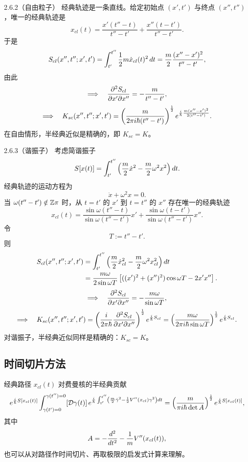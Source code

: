 \begin{example}{2.6.2（自由粒子）}
  经典轨迹是一条直线。给定初始点 $(x',t')$ 与终点 $(x'',t'')$，唯一的经典轨迹是
  \[
  x_{cl}(t)=\frac{x'(t''-t)}{t''-t'}+\frac{x''(t-t')}{t''-t'}.
  \]
  于是
  \[
  S_{cl}(x'',t'';x',t')=\int_{t'}^{t''}\frac12 m\dot x_{cl}(t)^2\,d t
  =\frac{m}{2}\frac{(x''-x')^2}{t''-t'},
  \]
  由此
  \[
  \Longrightarrow\quad
  \frac{\partial^2 S_{cl}}{\partial x'\partial x''}=-\frac{m}{t''-t'},
  \]
  \[
  \Longrightarrow\quad
  K_{sc}(x'',t'';x',t')=
  \left(\frac{m}{2\pi i\hbar(t''-t')}\right)^{\frac12}
  e^{\frac{i}{\hbar}\frac{m(x''-x')^2}{2(t''-t')}}.
  \]
  在自由情形，半经典近似是精确的，即 $K_{sc}=K$。
\end{example}

\begin{example}{2.6.3（谐振子）}
  考虑简谐振子
  \[
  S[x(t)]=\int_{t'}^{t''}\left(\frac{m}{2}\dot x^2-\frac{m}{2}\omega^2x^2\right)d t.
  \]
  经典轨迹的运动方程为
  \[
  \ddot x+\omega^2x=0.
  \]
  当 $\omega(t''-t')\notin\mathbb{Z}\pi$ 时，从 $t=t'$ 的 $x'$ 到 $t=t''$ 的 $x''$ 存在唯一的经典轨迹
  \[
  x_{cl}(t)=\frac{\sin\omega(t''-t)}{\sin\omega(t''-t')}x'
  +\frac{\sin\omega(t-t')}{\sin\omega(t''-t')}x''.
  \]
  令
  \[
  T:=t''-t'.
  \]
  则
  \[
  \begin{aligned}
  S_{cl}(x'',t'';x',t')
  &=\int_{t'}^{t''}\left(\frac{m}{2}\dot x_{cl}^2-\frac{m}{2}\omega^2x_{cl}^2\right)d t\\
  &=\frac{m\omega}{2\sin\omega T}\left[((x')^2+(x'')^2)\cos\omega T-2x'x''\right].
  \end{aligned}
  \]
  \[
  \Longrightarrow\quad
  \frac{\partial^2 S_{cl}}{\partial x'\partial x''}=-\frac{m\omega}{\sin\omega T},
  \]
  \[
  \Longrightarrow\quad
  K_{sc}(x'',t'';x',t')=
  \left(\frac{i}{2\pi\hbar}\frac{\partial^2 S_{cl}}{\partial x'\partial x''}\right)^{\frac12}
  e^{\frac{i}{\hbar}S_{cl}}
  =\left(\frac{m\omega}{2\pi i\hbar\sin\omega T}\right)^{\frac12}
  e^{\frac{i}{\hbar}S_{cl}}.
  \]
  对谐振子，半经典近似同样是精确的：$K_{sc}=K$。
\end{example}

\subsection{时间切片方法}

经典路径 $x_{cl}(t)$ 对费曼核的半经典贡献
\[
e^{\frac{i}{\hbar}S[x_{cl}(t)]}
\int_{\gamma(t')=0}^{\gamma(t'')=0}[\mathcal{D}\gamma(t)]\,
e^{\frac{i}{\hbar}\int_{t'}^{t''}\left(\frac{m}{2}\dot\gamma^2
-\frac12V''(x_{cl})\gamma^2\right)d t}
=\left(\frac{m}{\pi i\hbar\det A}\right)^{\frac12}
e^{\frac{i}{\hbar}S[x_{cl}(t)]},
\]
其中
\[
A=-\frac{d^2}{d t^2}-\frac1m V''(x_{cl}(t)),
\]
也可以从对路径作时间切片、再取极限的启发式计算来理解。

